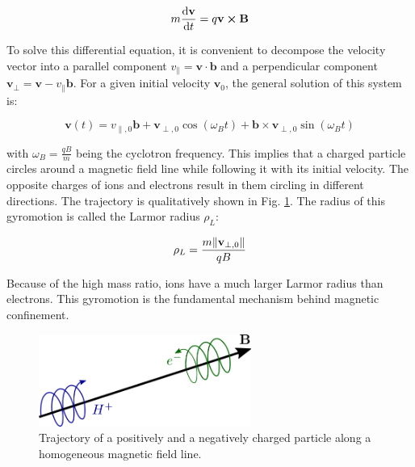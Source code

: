 \begin{equation}
	\label{eq:gyromotion_LorentzForce}
	m\dv{\textbf{v}}{t} = q\textbf{v}\cross\textbf{B}
\end{equation}

To solve this differential equation, it is convenient to decompose the velocity vector into a parallel component \( v_\parallel = \textbf{v}\cdot\textbf{b} \) and a perpendicular component \( \textbf{v}_\perp = \textbf{v} - v_\parallel \textbf{b} \). For a given initial velocity \(\mathbf{v}_0\), the general solution of this system is:

\begin{equation}
	\mathbf{v}(t) = v_{\parallel,0}\mathbf{b} + \mathbf{v}_{\perp,0}\cos(\omega_B t) + \mathbf{b} \times \mathbf{v}_{\perp,0} \sin(\omega_B t)
\end{equation}

with \(\omega_B = \frac{qB}{m}\) being the cyclotron frequency. This implies that a charged particle circles around a magnetic field line while following it with its initial velocity. The opposite charges of ions and electrons result in them circling in different directions. The trajectory is qualitatively shown in Fig. \ref{fig:TokamakBasics_gyromotion}. The radius of this gyromotion is called the Larmor radius \(\rho_L\):

\begin{equation}
	\rho_L = \frac{m\norm{\mathbf{v}_{\perp,0}}}{qB}
\end{equation}

Because of the high mass ratio, ions have a much larger Larmor radius than electrons. This gyromotion is the fundamental mechanism behind magnetic confinement. \newline 


\begin{figure}[H]
	\centering
	\includegraphics[width=0.62\textwidth]{schemes/gyromotion.png}
	\caption{Trajectory of a positively and a negatively charged particle along a homogeneous magnetic field line.}
	\label{fig:TokamakBasics_gyromotion}
\end{figure}


